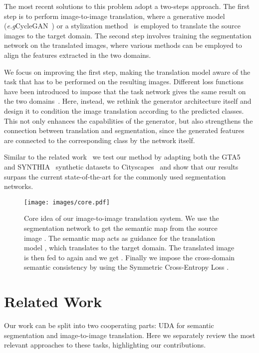 \documentclass{bmvc2k}
\def\eg{\emph{e.g}\bmvaOneDot}
\begin{document}
The most recent solutions to this problem adopt a two-steps approach. The first step is to perform image-to-image translation, where a generative model (\eg CycleGAN~\cite{cyclegan}) or a stylization method~\cite{domstylization} is employed to translate the source images to the target domain. The second step involves training the segmentation network on the translated images, where various methods can be employed to align the features extracted in the two domains.

We focus on improving the first step, making the translation model aware of the task that has to be performed on the resulting images. Different loss functions have been introduced to impose that the task network gives the same result on the two domains~\cite{cycada, crdoco, bdl}. Here, instead, we rethink the generator architecture itself and design it to condition the image translation according to the predicted classes. This not only enhances the capabilities of the generator, but also strengthens the connection between translation and segmentation, since the generated features are connected to the corresponding class by the network itself.

Similar to the related work~\cite{cycada, adaptsegnet, clan, crdoco, bdl} we test our method by adapting both the GTA5~\cite{gta} and SYNTHIA~\cite{synthia} synthetic datasets to Cityscapes~\cite{cityscapes} and show that our results surpass the current state-of-the-art for the commonly used segmentation networks.

\begin{figure}
	\begin{center}
		\texttt{[image: images/core.pdf]}
	\end{center}
	\caption{Core idea of our image-to-image translation system. We use the segmentation network  to get the semantic map  from the source image . The semantic map acts as guidance for the translation model , which translates  to the target domain. The translated image  is then fed to  again and we get . Finally we impose the cross-domain semantic consistency by using the Symmetric Cross-Entropy Loss .}
	\label{fig:i2i-flow}
\end{figure}

\section{Related Work}
Our work can be split into two cooperating parts: UDA for semantic segmentation and image-to-image translation. Here we separately review the most relevant approaches to these tasks, highlighting our contributions.
\end{document}
